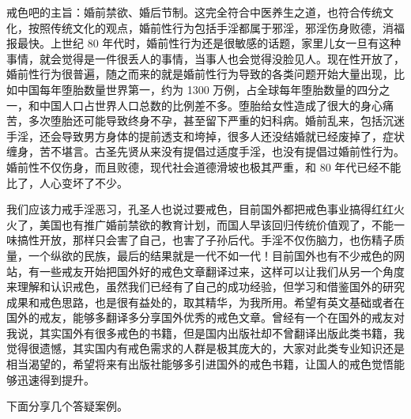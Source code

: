 \documentclass{ctexart}
\begin{document}
戒色吧的主旨：婚前禁欲、婚后节制。这完全符合中医养生之道，也符合传统文化，按照传统文化的观点，婚前性行为包括手淫都属于邪淫，邪淫伤身败德，消福报最快。上世纪 80 年代时，婚前性行为还是很敏感的话题，家里儿女一旦有这种事情，就会觉得是一件很丢人的事情，当事人也会觉得没脸见人。现在性开放了，婚前性行为很普遍，随之而来的就是婚前性行为导致的各类问题开始大量出现，比如中国每年堕胎数量世界第一，约为 1300 万例，占全球每年堕胎数量的四分之一，和中国人口占世界人口总数的比例差不多。堕胎给女性造成了很大的身心痛苦，多次堕胎还可能导致终身不孕，甚至留下严重的妇科病。婚前乱来，包括沉迷手淫，还会导致男方身体的提前透支和垮掉，很多人还没结婚就已经废掉了，症状缠身，苦不堪言。古圣先贤从来没有提倡过适度手淫，也没有提倡过婚前性行为。婚前性不仅伤身，而且败德，现代社会道德滑坡也极其严重，和 80 年代已经不能比了，人心变坏了不少。

我们应该力戒手淫恶习，孔圣人也说过要戒色，目前国外都把戒色事业搞得红红火火了，美国也有推广婚前禁欲的教育计划，而国人早该回归传统价值观了，不能一味搞性开放，那样只会害了自己，也害了子孙后代。手淫不仅伤脑力，也伤精子质量，一个纵欲的民族，最后的结果就是一代不如一代！目前国外也有不少戒色的网站，有一些戒友开始把国外好的戒色文章翻译过来，这样可以让我们从另一个角度来理解和认识戒色，虽然我们已经有了自己的成功经验，但学习和借鉴国外的研究成果和戒色思路，也是很有益处的，取其精华，为我所用。希望有英文基础或者在国外的戒友，能够多翻译多分享国外优秀的戒色文章。曾经有一个在国外的戒友对我说，其实国外有很多戒色的书籍，但是国内出版社却不曾翻译出版此类书籍，我觉得很遗憾，其实国内有戒色需求的人群是极其庞大的，大家对此类专业知识还是相当渴望的，希望将来有出版社能够多引进国外的戒色书籍，让国人的戒色觉悟能够迅速得到提升。

下面分享几个答疑案例。
\end{document}
